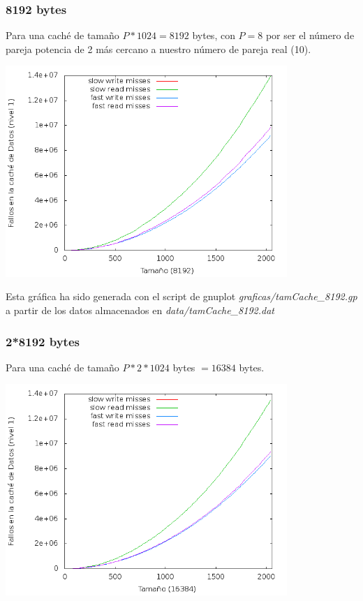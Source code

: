 \documentclass[nochap]{apuntes}
\begin{document}
\subsubsection{8192 bytes}
Para una caché de tamaño $P*1024 = 8192$ bytes, con $P=8$ por ser el número de pareja potencia de 2 más cercano a nuestro número de pareja real (10).

\begin{center}
\includegraphics[width=0.8\textwidth]{graficas/fotos/Cache_8192.png}
\end{center}

Esta gráfica ha sido generada con el script de gnuplot \emph{graficas/tamCache\_8192.gp} a partir de los datos almacenados en \emph{data/tamCache\_8192.dat}
\subsubsection{2*8192 bytes}
Para una caché de tamaño $P*2*1024$ bytes $= 16384 $ bytes.

\begin{center}
\includegraphics[width=0.8\textwidth]{graficas/fotos/Cache_16384.png}
\end{center}
\end{document}
